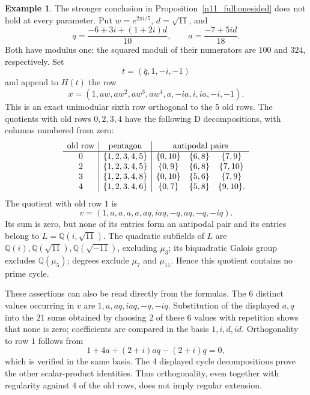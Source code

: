 \documentclass[11pt,a4paper]{article}
\theoremstyle{plain}
\theoremstyle{definition}
\newtheorem{example}[theorem]{Example}
\theoremstyle{plain}
\begin{document}
\medskip
\par\addvspace{\medskipamount}\noindent
\begin{minipage}{\linewidth}
\begin{example}
The stronger conclusion in Proposition~\ref{n11_full:onesided} does not hold at every parameter. Put $w=e^{2\pi i/5}$, $d=\sqrt{11}$, and
$$q=\frac{-6+3i+(1+2i)d}{10},\qquad a=\frac{-7+5id}{18}.$$
Both have modulus one: the squared moduli of their numerators are $100$ and $324$, respectively. Set
$$t=(\bar q,1,-i,-1)$$
and append to $H(t)$ the row
$$x=(1,aw,aw^{2},aw^{3},aw^{4},a,-ia,i,ia,-i,-1).$$
This is an exact unimodular sixth row orthogonal to the 5 old rows. The quotients with old rows $0,2,3,4$ have the following $\mathrm{D}$ decompositions, with columns numbered from zero:
$$\begin{array}{c|c|ccc}
\text{old row}&\text{pentagon}&\multicolumn{3}{c}{\text{antipodal pairs}}\\\hline
0&\{1,2,3,4,5\}&\{0,10\}&\{6,8\}&\{7,9\}\\
2&\{1,2,3,4,5\}&\{0,9\}&\{6,8\}&\{7,10\}\\
3&\{1,2,3,4,8\}&\{0,10\}&\{5,6\}&\{7,9\}\\
4&\{1,2,3,4,6\}&\{0,7\}&\{5,8\}&\{9,10\}.
\end{array}$$
The quotient with old row $1$ is
$$v=(1,a,a,a,a,aq,iaq,-q,aq,-q,-iq).$$
Its sum is zero, but none of its entries form an antipodal pair and its entries belong to $L=\mathbb Q(i,\sqrt{11})$. The quadratic subfields of $L$ are $\mathbb Q(i),\mathbb Q(\sqrt{11}),\mathbb Q(\sqrt{-11})$, excluding $\mu_3$; its biquadratic Galois group excludes $\mathbb Q(\mu_5)$; degrees exclude $\mu_7$ and $\mu_{11}$. Hence this quotient contains no prime cycle.

These assertions can also be read directly from the formulas. The 6 distinct values occurring in $v$ are $1,a,aq,iaq,-q,-iq$. Substitution of the displayed $a,q$ into the $21$ sums obtained by choosing 2 of these 6 values with repetition shows that none is zero; coefficients are compared in the basis $1,i,d,id$. Orthogonality to row $1$ follows from
$$1+4a+(2+i)aq-(2+i)q=0,$$
which is verified in the same basis. The 4 displayed cycle decompositions prove the other scalar-product identities. Thus orthogonality, even together with regularity against $4$ of the old rows, does not imply regular extension.
\end{example}
\end{minipage}
\par\addvspace{\medskipamount}
\end{document}
